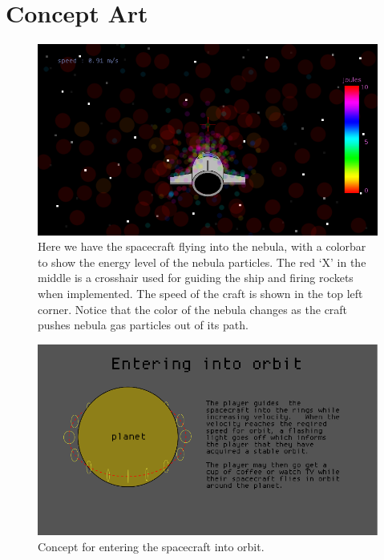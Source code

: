 \section{Concept Art}

\begin{figure}[H]
  \centering
  \includegraphics[scale=0.5]{../../milestone2/images/10-nebula.png}
  \caption{Here we have the spacecraft flying into the nebula, with a colorbar to show the energy level of the nebula particles.  The red `X' in the middle is a crosshair used for guiding the ship and firing rockets when implemented.  The speed of the craft is shown in the top left corner.  Notice that the color of the nebula changes as the craft pushes nebula gas particles out of its path.}
\end{figure}

\begin{figure}[H]
  \centering
  \includegraphics[scale=0.5]{../../milestone2/images/12-orbit.png}
  \caption{Concept for entering the spacecraft into orbit.}
\end{figure}





